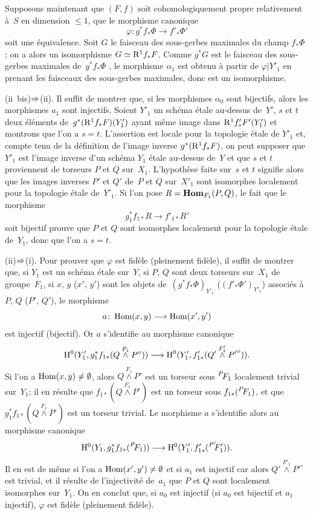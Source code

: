 Supposons maintenant que $(F,f)$ soit cohomologiquement propre
relativement \`a~$S$ en dimension $\leqslant 1$, \ie que le
morphisme canonique
$$
\varphi \colon g^* f_* \Phi \to f'_* \Phi'
$$
soit une \'equivalence. Soit $G$ le faisceau des sous-gerbes
maximales du champ $f_* \Phi$ \hbox{\cite[III~2.1.8]{XIII.1}}; on a alors un
isomorphisme $G \simeq \mathrm{R}^1 f_* F$. Comme $g^* G$ est le
faisceau des sous-gerbes maximales de~$g^* f_* \Phi$ \cite[III
2.1.5.5]{XIII.2}, le morphisme $\alpha_1$ est obtenu \`a partir de
$\varphi|Y'_1$ en prenant les faisceaux des sous-gerbes maximales,
donc est un isomorphisme.

(ii~bis)$\To$(ii). Il suffit de montrer que, si les
morphismes $\alpha_0$ sont bijectifs, alors les morphismes $a_1$ sont
injectifs. Soient $Y'_1$ un sch\'ema \'etale au-dessus de~$Y'$,
$s$ et $t$ deux \'el\'ements de~$g^*(\mathrm{R}^1 f_* F)(Y'_1)$
ayant m\^eme image dans $\mathrm{R}^1 f'_* F'(Y'_1)$ et montrons que
l'on a $s=t$. L'assertion est locale pour la topologie \'etale de
$Y'_1$ et, compte tenu de la d\'efinition de l'image inverse
$g^*(\mathrm{R}^1 f_* F)$, on peut supposer que $Y'_1$ est l'image
inverse d'un sch\'ema $Y_1$ \'etale au-dessus de~$Y$ et que $s$ et
$t$ proviennent de torseurs $P$ et $Q$ sur~$X_1$. L'hypoth\`ese
faite sur~$s$ et $t$ signifie alors que les images inverses $P'$ et
$Q'$ de~$P$ et $Q$ sur~$X'_1$ sont isomorphes localement pour la
topologie \'etale de~$Y'_1$. Si l'on pose $R =
\operatorname{\mathbf{Hom}}_{F_1}(P,Q)$, le fait que le morphisme
$$
g_1^* f_{1 *} R \to f'_{1 *} R'
$$
soit bijectif prouve que $P$ et $Q$ sont isomorphes localement pour la
topologie \'etale de~$Y_1$, donc que l'on a $s=t$.

(ii)$\To$(i). Pour prouver que $\varphi$ est fid\`ele
(\resp pleinement fid\`ele), il suffit de montrer que, si $Y_1$ est
un sch\'ema \'etale sur~$Y$, si $P$, $Q$ sont deux torseurs sur~$X_1$ de groupe~$F_1$, si $x$, $y$ (\resp $x'$, $y'$) sont les objets
de~$(g^* f_* \Phi)_{Y'_1}$ (\resp $(f'_* \Phi')_{Y'_1}$)
associ\'es \`a $P$, $Q$ (\resp $P'$, $Q'$), le morphisme
$$
a \colon \Hom(x,y) \to \Hom(x',y')
$$
est injectif (\resp bijectif). Or $a$ s'identifie au morphisme
canonique
$$
\H^0(Y'_1,g^*_1 f_{1 *} (Q \overset{F_1}{\wedge} P^\circ)) \to
\H^0(Y'_1, f'_{1 *}(Q' \overset{F'_1}{\wedge} {P'}^\circ))\text{.}
$$
Si
l'on a $\operatorname{Hom}(x,y) \neq \emptyset$, alors $Q \overset{F_1}{\wedge}
P^\circ$ est un torseur sous $\leftexp{P\mkern-4mu}{F}_1$ localement trivial sur~$Y_1$; il en r\'esulte que $f_{1 *}(Q \overset{F_1}{\wedge}
P^\circ)$ est un torseur sous $f_{1*}(\leftexp{P\mkern-4mu}{F}_1)$, et que
$g^*_1 f_{1 *} (Q \overset{F_1}{\wedge} P^\circ)$ est un torseur
trivial. Le morphisme $a$ s'identifie alors au morphisme canonique
$$
\H^0(Y_1, g^*_1 f_{1 *}(\leftexp{P\mkern-4mu}{F}_1)) \to \H^0 (Y'_1,
f'_{1 *}(\leftexp{P'\mkern-6mu}{F}'_1)) \text{.}
$$
Il en est de m\^eme si l'on a $\operatorname{Hom}(x',y') \neq \emptyset$ et si
$a_1$ est injectif car alors $Q' \overset{F'_1}{\wedge} {P'}^\circ$
est trivial, et il r\'esulte de l'injectivit\'e de~$a_1$ que $P$
et $Q$ sont localement isomorphes sur~$Y_1$. On en conclut que, si
$a_0$ est injectif (\resp si $a_0$ est bijectif et $a_1$ injectif),
$\varphi$ est fid\`ele (\resp pleinement fid\`ele).

